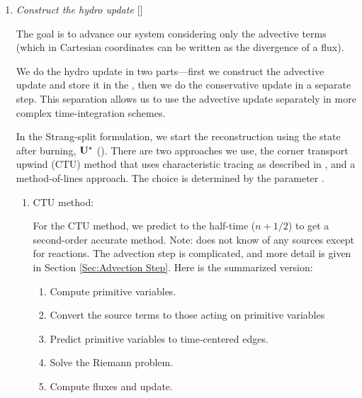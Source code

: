 \begin{enumerate}
  For MOL integration, we need to preserve the state with the result
  of the burn and old-time sources, so we save this in a
  \multifab\ .  After all the stages of the MOL
  integration are computed, we use this as the starting point for 
  constructing the final update. .

\item \label{strang:hydro} {\em Construct the hydro update} []

  The goal is to advance our system considering only the advective
  terms (which in Cartesian coordinates can be written as the
  divergence of a flux).

  We do the hydro update in two parts---first we construct the
  advective update and store it in the 
  \multifab, then we do the conservative update in a separate step.  This
  separation allows us to use the advective update separately in more
  complex time-integration schemes.

  In the Strang-split formulation, we start the reconstruction using
  the state after burning, ${\bf U}^\star$ ().  There
  are two approaches we use, the corner transport upwind (CTU) method
  that uses characteristic tracing as described in
  \cite{colella:1990}, and a method-of-lines approach.  The choice is 
  determined by the parameter .

  \begin{enumerate}
  \item CTU method:

    For the CTU method, we predict to the half-time ($n+1/2$) to get a
    second-order accurate method.  Note:  does not
    know of any sources except for reactions.  The advection step is
    complicated, and more detail is given in Section
    \ref{Sec:Advection Step}.  Here is the summarized version:
  \begin{enumerate}
  \item Compute primitive variables.
  \item Convert the source terms to those acting on primitive variables
  \item Predict primitive variables to time-centered edges.
  \item Solve the Riemann problem.
  \item Compute fluxes and update.
  \end{enumerate}


\end{enumerate}
\end{enumerate}
